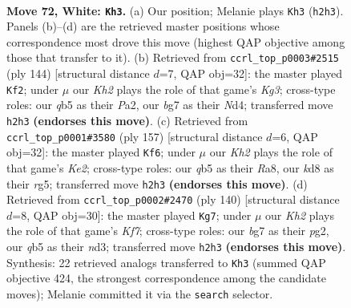 \documentclass[11pt]{article}
\begin{document}
\clearpage

\begin{figure}[p]\centering
\begin{subfigure}{0.46\textwidth}\centering
\resizebox{\linewidth}{!}{%
\newchessgame
\chessboard[
  setfen={3k4/3P1pb1/8/1q6/8/8/7K/8 w - - 7 72},
  showmover=false,
  pgfstyle=straightmove, color=movearrow, markmove={h2-h3}
]}
\caption{}
\end{subfigure}\hfill
\begin{subfigure}{0.46\textwidth}\centering
\resizebox{\linewidth}{!}{%
\newchessgame
\chessboard[
  setfen={7k/7P/6b1/8/3N4/2p3K1/P7/8 w - - 0 73},
  showmover=false,
  pgfstyle=straightmove, color=movearrow, markmove={g3-f2}
]}
\caption{}
\end{subfigure}
\\[4pt]
\begin{subfigure}{0.46\textwidth}\centering
\resizebox{\linewidth}{!}{%
\newchessgame
\chessboard[
  setfen={r7/4k3/7P/6R1/6p1/6K1/8/8 b - - 4 79},
  showmover=false,
  pgfstyle=straightmove, color=movearrow, markmove={e7-f6}
]}
\caption{}
\end{subfigure}\hfill
\begin{subfigure}{0.46\textwidth}\centering
\resizebox{\linewidth}{!}{%
\newchessgame
\chessboard[
  setfen={8/5K2/8/1k6/1P6/3n3N/6p1/8 w - - 2 71},
  showmover=false,
  pgfstyle=straightmove, color=movearrow, markmove={f7-g7}
]}
\caption{}
\end{subfigure}
\caption{\textbf{Move 72, White: \texttt{Kh3}.} (a) Our position; Melanie plays \texttt{Kh3} (\texttt{h2h3}). Panels (b)--(d) are the retrieved master positions whose correspondence most drove this move (highest QAP objective among those that transfer to it). (b) Retrieved from \texttt{ccrl\_top\_p0003\#2515} (ply 144) [structural distance $d$=7, QAP obj=32]: the master played \texttt{Kf2}; under $\mu$ our \emph{Kh2} plays the role of that game's \emph{Kg3}; cross-type roles: our \emph{q}b5 as their \emph{P}a2, our \emph{b}g7 as their \emph{N}d4; transferred move \texttt{h2h3} \textbf{(endorses this move)}. (c) Retrieved from \texttt{ccrl\_top\_p0001\#3580} (ply 157) [structural distance $d$=6, QAP obj=32]: the master played \texttt{Kf6}; under $\mu$ our \emph{Kh2} plays the role of that game's \emph{Ke2}; cross-type roles: our \emph{q}b5 as their \emph{R}a8, our \emph{k}d8 as their \emph{r}g5; transferred move \texttt{h2h3} \textbf{(endorses this move)}. (d) Retrieved from \texttt{ccrl\_top\_p0002\#2470} (ply 140) [structural distance $d$=8, QAP obj=30]: the master played \texttt{Kg7}; under $\mu$ our \emph{Kh2} plays the role of that game's \emph{Kf7}; cross-type roles: our \emph{b}g7 as their \emph{p}g2, our \emph{q}b5 as their \emph{n}d3; transferred move \texttt{h2h3} \textbf{(endorses this move)}. Synthesis: 22 retrieved analogs transferred to \texttt{Kh3} (summed QAP objective 424, the strongest correspondence among the candidate moves); Melanie committed it via the \texttt{search} selector.}
\label{fig:thought-m142}
\end{figure}
\end{document}
